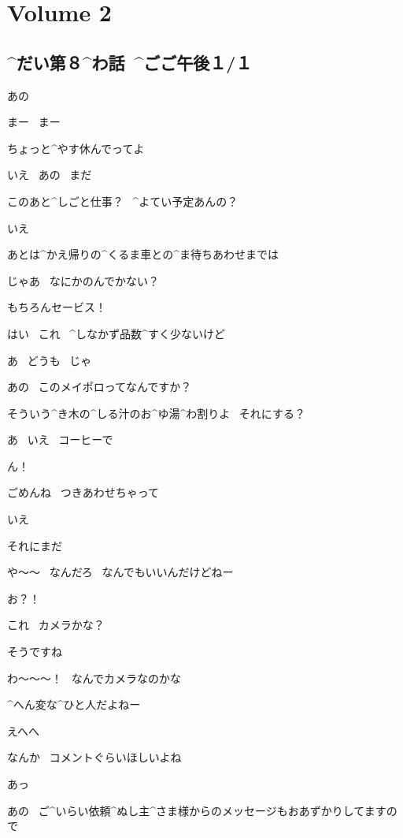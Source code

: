 \section{Volume 2}

\subsection{^{だい}{第}８^{わ}{話}\ ^{ごご}{午後}１/１}

\page[4]
\Kokone あの

\Alpha まー
\ まー

\Alpha ちょっと^{やす}{休}んでってよ

\Kokone いえ
\ あの
\ まだ

\Alpha このあと^{しごと}{仕事}？
\ ^{よてい}{予定}あんの？

\Kokone いえ

\Kokone あとは^{かえ}{帰}りの^{くるま}{車}との^{ま}{待}ちあわせまでは

\Alpha じゃあ
\ なにかのんでかない？

\Alpha もちろんセービス！

\Alpha はい
\ これ
\ ^{しなかず}{品数}^{すく}{少}ないけど

\Kokone あ
\ どうも
\ じゃ

\page[5]
\Kokone あの
\ このメイポロってなんですか？

\Alpha そういう^{き}{木}の^{しる}{汁}のお^{ゆ}{湯}^{わ}{割}りよ
\ それにする？

\Kokone あ
\ いえ
\ コーヒーで

\Alpha ん！

\Alpha ごめんね
\ つきあわせちゃって

\Kokone いえ

\Kokone それにまだ

\Alpha や〜〜
\ なんだろ
\ なんでもいいんだけどねー

\page[6]
\Alpha お？！

\Alpha これ
\ カメラかな？

\Kokone そうですね

\Alpha わ〜〜〜！
\ なんでカメラなのかな

\Alpha ^{へん}{変}な^{ひと}{人}だよねー

\Alpha えへへ

\Alpha なんか
\ コメントぐらいほしいよね

\Kokone あっ

\page[7]
\Kokone あの
\ ご^{いらい}{依頼}^{ぬし}{主}^{さま}{様}からのメッセージもおあずかりしてますので

